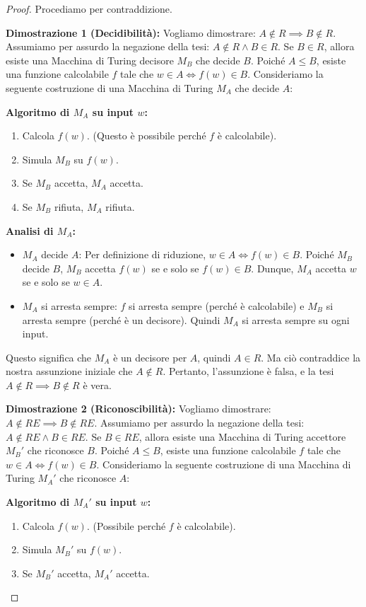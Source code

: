\documentclass[a4paper]{article}
\theoremstyle{definition} %
\begin{document}
\begin{proof}
Procediamo per contraddizione.

\textbf{Dimostrazione 1 (Decidibilità):}
Vogliamo dimostrare: $A \notin R \implies B \notin R$.
Assumiamo per assurdo la negazione della tesi: $A \notin R \land B \in R$.
Se $B \in R$, allora esiste una Macchina di Turing decisore $M_B$ che decide $B$.
Poiché $A \le B$, esiste una funzione calcolabile $f$ tale che $w \in A \iff f(w) \in B$.
Consideriamo la seguente costruzione di una Macchina di Turing $M_A$ che decide $A$:

\textbf{Algoritmo di $M_A$ su input $w$:}
\begin{enumerate}
    \item Calcola $f(w)$. (Questo è possibile perché $f$ è calcolabile).
    \item Simula $M_B$ su $f(w)$.
    \item Se $M_B$ accetta, $M_A$ accetta.
    \item Se $M_B$ rifiuta, $M_A$ rifiuta.
\end{enumerate}

\textbf{Analisi di $M_A$:}
\begin{itemize}
    \item $M_A$ decide $A$: Per definizione di riduzione, $w \in A \iff f(w) \in B$. Poiché $M_B$ decide $B$, $M_B$ accetta $f(w)$ se e solo se $f(w) \in B$. Dunque, $M_A$ accetta $w$ se e solo se $w \in A$.
    \item $M_A$ si arresta sempre: $f$ si arresta sempre (perché è calcolabile) e $M_B$ si arresta sempre (perché è un decisore). Quindi $M_A$ si arresta sempre su ogni input.
\end{itemize}
Questo significa che $M_A$ è un decisore per $A$, quindi $A \in R$.
Ma ciò contraddice la nostra assunzione iniziale che $A \notin R$.
Pertanto, l'assunzione è falsa, e la tesi $A \notin R \implies B \notin R$ è vera.

\textbf{Dimostrazione 2 (Riconoscibilità):}
Vogliamo dimostrare: $A \notin RE \implies B \notin RE$.
Assumiamo per assurdo la negazione della tesi: $A \notin RE \land B \in RE$.
Se $B \in RE$, allora esiste una Macchina di Turing accettore $M_B'$ che riconosce $B$.
Poiché $A \le B$, esiste una funzione calcolabile $f$ tale che $w \in A \iff f(w) \in B$.
Consideriamo la seguente costruzione di una Macchina di Turing $M_A'$ che riconosce $A$:

\textbf{Algoritmo di $M_A'$ su input $w$:}
\begin{enumerate}
    \item Calcola $f(w)$. (Possibile perché $f$ è calcolabile).
    \item Simula $M_B'$ su $f(w)$.
    \item Se $M_B'$ accetta, $M_A'$ accetta.
\end{enumerate}


\end{proof}
\end{document}
